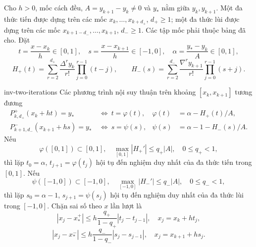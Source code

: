 \documentclass[12pt,a4paper,oneside]{book}
\numberwithin{algorithm}{chapter}
\theoremstyle{definition}
\begin{document}
Cho $h>0$, mốc cách đều, $A=y_{k+1}-y_k\ne0$ và $y_\ast$ nằm giữa $y_k,y_{k+1}$. Một đa thức tiến được dựng trên các mốc $x_k,\ldots,x_{k+d_+}$, $d_+\geq1$; một đa thức lùi được dựng trên các mốc $x_{k+1-d_-},\ldots,x_{k+1}$, $d_-\geq1$. Các tập mốc phải thuộc bảng đã cho. Đặt
\[
 t=\frac{x-x_k}h\in[0,1],\quad
 s=\frac{x-x_{k+1}}h\in[-1,0],\quad
 \alpha=\frac{y_\ast-y_k}{A}\in[0,1],
\]
\[
 H_+(t)=\sum_{r=2}^{d_+}\frac{\Delta^ry_k}{r!}\prod_{j=0}^{r-1}(t-j),\qquad
 H_-(s)=\sum_{r=2}^{d_-}\frac{\nabla^ry_{k+1}}{r!}\prod_{j=0}^{r-1}(s+j).
\]
\begin{menhde}{}{inv-two-iterations}
\label{md:inv-forward-iteration}
Các phương trình nội suy thuận trên khoảng $[x_k,x_{k+1}]$ tương đương
\begin{align}
 P_{k,d_+}^{+}(x_k+ht)=y_\ast
 &\ \Longleftrightarrow\ t=\varphi(t),
 &\varphi(t)&=\alpha-H_+(t)/A,\label{eq:inv-forward-k}\\
 P_{k+1,d_-}^{-}(x_{k+1}+hs)=y_\ast
 &\ \Longleftrightarrow\ s=\psi(s),
 &\psi(s)&=\alpha-1-H_-(s)/A.\label{eq:inv-backward-k}
\end{align}
Nếu
\[
 \varphi([0,1])\subset[0,1],\quad
 \max_{[0,1]}|H_+'|\leq q_+|A|,\quad 0\leq q_+<1,
\]
thì lặp $t_0=\alpha$, $t_{j+1}=\varphi(t_j)$ hội tụ đến nghiệm duy nhất của đa thức tiến trong $[0,1]$. Nếu
\[
 \psi([-1,0])\subset[-1,0],\quad
 \max_{[-1,0]}|H_-'|\leq q_-|A|,\quad 0\leq q_-<1,
\]
thì lặp $s_0=\alpha-1$, $s_{j+1}=\psi(s_j)$ hội tụ đến nghiệm duy nhất của đa thức lùi trong $[-1,0]$. Chặn sai số theo $x$ lần lượt là
\[
 |x_j-x_*^+|\leq h\frac{q_+}{1-q_+}|t_j-t_{j-1}|,
 \quad x_j=x_k+ht_j,
\]
\[
 |x_j-x_*^-|\leq h\frac{q_-}{1-q_-}|s_j-s_{j-1}|,
 \quad x_j=x_{k+1}+hs_j.
\]
\end{menhde}
\end{document}
